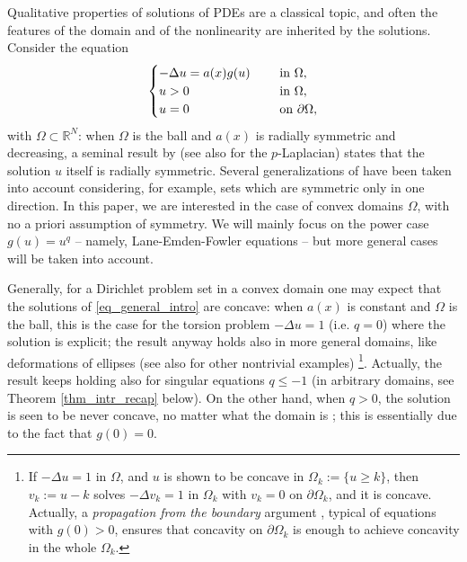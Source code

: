 \documentclass[11pt, reqno]{amsart}
\theoremstyle{definition}
\numberwithin{equation}{section}
\newcommand{\R}{\mathbb{R}}
\begin{document}
Qualitative properties of solutions of PDEs are a classical topic, and often the features of the domain and of the nonlinearity are inherited by the solutions. 
Consider the equation
\begin{equation}\label{eq_general_intro}
 \begin{cases}
-\Delta u = a(x) g(u) & \quad \hbox{ in $\Omega$},\\ 
u >0 & \quad \hbox{ in $\Omega$}, \\
u =0 & \quad \hbox{ on $\partial \Omega$},
\end{cases}
\end{equation}
with $\Omega \subset \R^N$: when $\Omega$ is the ball and $a(x)$ is radially symmetric and decreasing, a seminal result by \cite[Theorem 1']{GNN79} (see also \cite{DaSc04, MMPS14} for the $p$-Laplacian) states that the solution $u$ itself is radially symmetric.
Several generalizations of \cite{GNN79} have been taken into account considering, for example, sets which are symmetric only in one direction.
In this paper, we are interested in the case of convex domains $\Omega$, with no a priori assumption of symmetry. We will mainly focus on the power case $g(u)=u^q$ -- namely, Lane-Emden-Fowler equations -- but more general cases will be taken into account.

Generally, for a Dirichlet problem set in a convex domain one may expect that the solutions of \eqref{eq_general_intro} are concave:
when $a(x)$ is constant and $\Omega$ is the ball, this is the case for the torsion problem $-\Delta u=1$ (i.e. $q=0$) where the solution is explicit; the result anyway holds also in more general domains, like deformations of ellipses \cite{HNST18, Ste22} (see also \cite{ChWe23} for other nontrivial examples)%
\footnote{If $-\Delta u =1$ in $\Omega$, and $u$ is shown to be concave in $\Omega_k:=\{u \geq k\}$, then $v_k:= u-k$ solves $-\Delta v_k =1$ in $\Omega_k$ with $v_k=0$ on $\partial \Omega_k$, and it is concave. 
Actually, a \emph{propagation from the boundary} argument \cite{KeMn93, Ste22, ChWe23}, typical of equations with $g(0)>0$, ensures that concavity on $\partial \Omega_k$ is enough to achieve concavity in the whole $\Omega_k$.
}.
 Actually, the result keeps holding also for singular equations $q\leq -1$ (in arbitrary domains, see Theorem \ref{thm_intr_recap} below).
On the other hand, when $q>0$, the solution is seen to be never concave, no matter what the domain is \cite[Remark 4.1]{AAGS23}; this is essentially due to the fact that $g(0)=0$.
\end{document}
